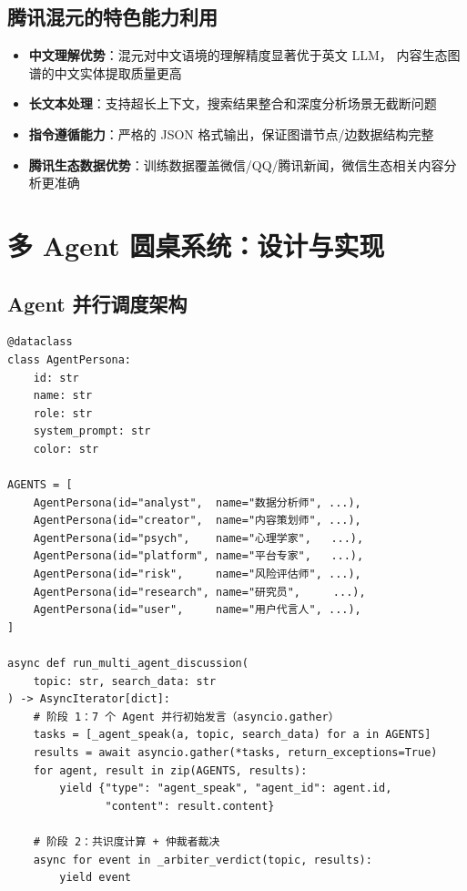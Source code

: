 \documentclass[12pt,a4paper]{ctexart}
\begin{document}
\subsection{腾讯混元的特色能力利用}

\begin{itemize}
  \item \textbf{中文理解优势}：混元对中文语境的理解精度显著优于英文 LLM，
        内容生态图谱的中文实体提取质量更高
  \item \textbf{长文本处理}：支持超长上下文，搜索结果整合和深度分析场景无截断问题
  \item \textbf{指令遵循能力}：严格的 JSON 格式输出，保证图谱节点/边数据结构完整
  \item \textbf{腾讯生态数据优势}：训练数据覆盖微信/QQ/腾讯新闻，微信生态相关内容分析更准确
\end{itemize}


\section{多 Agent 圆桌系统：设计与实现}

\subsection{Agent 并行调度架构}

\begin{lstlisting}[style=pycode,caption={engines/multi\_agent.py — 7 Agent 并行发言}]
@dataclass
class AgentPersona:
    id: str
    name: str
    role: str
    system_prompt: str
    color: str

AGENTS = [
    AgentPersona(id="analyst",  name="数据分析师", ...),
    AgentPersona(id="creator",  name="内容策划师", ...),
    AgentPersona(id="psych",    name="心理学家",   ...),
    AgentPersona(id="platform", name="平台专家",   ...),
    AgentPersona(id="risk",     name="风险评估师", ...),
    AgentPersona(id="research", name="研究员",     ...),
    AgentPersona(id="user",     name="用户代言人", ...),
]

async def run_multi_agent_discussion(
    topic: str, search_data: str
) -> AsyncIterator[dict]:
    # 阶段 1：7 个 Agent 并行初始发言（asyncio.gather）
    tasks = [_agent_speak(a, topic, search_data) for a in AGENTS]
    results = await asyncio.gather(*tasks, return_exceptions=True)
    for agent, result in zip(AGENTS, results):
        yield {"type": "agent_speak", "agent_id": agent.id,
               "content": result.content}

    # 阶段 2：共识度计算 + 仲裁者裁决
    async for event in _arbiter_verdict(topic, results):
        yield event
\end{lstlisting}
\end{document}
